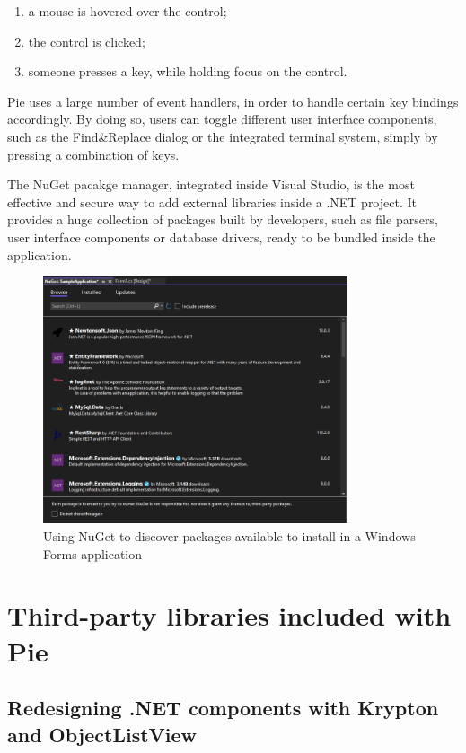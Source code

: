 \begin{enumerate}
  \item a mouse is hovered over the control;
  \item the control is clicked;
  \item someone presses a key, while holding focus on the control. 
\end{enumerate}

Pie uses a large number of event handlers, in order to handle certain key bindings accordingly. By doing so, users can toggle different user interface components, such as the Find\&Replace dialog or the integrated terminal system, simply by pressing a combination of keys. 

The NuGet pacakge manager, integrated inside Visual Studio, is the most effective and secure way to add external libraries inside a .NET project. It provides a huge collection of packages built by developers, such as file parsers, user interface components or database drivers, ready to be bundled inside the application.

\begin{figure}[H]
\centering
\includegraphics[width=0.8\textwidth]{images/nuget.png}
\caption{Using NuGet to discover packages available to install in a Windows Forms application}
\label{fig:fig2,1.}
\end{figure}

\section{Third-party libraries included with Pie}
\subsection{Redesigning .NET components with Krypton and ObjectListView}
